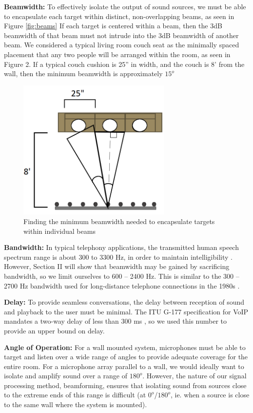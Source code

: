 \documentclass[10pt,journal,compsoc]{IEEEtran}
\begin{document}
\textbf{Beamwidth:} To effectively isolate the output of sound sources, we must be able to encapsulate each target within distinct, non-overlapping beams, as seen in Figure \ref{fig:beams} If each target is centered within a beam, then the 3dB beamwidth of that beam must not intrude into the 3dB beamwidth of another beam. We considered a typical living room couch seat as the minimally spaced placement that any two people will be arranged within the room, as seen in Figure 2. If a typical couch cushion is 25” in width, and the couch is 8’ from the wall, then the  minimum beamwidth is approximately $15^o$

\begin{figure}[!h]
    \centering
    \includegraphics[width=3in]{find_bw}
    \caption{Finding the minimum beamwidth needed to encapsulate targets within individual beams}
    \label{fig:find_bw}
\end{figure}

\textbf{Bandwidth:} In typical telephony applications, the transmitted human speech spectrum range is about 300 to 3300 Hz, in order to maintain intelligibility  \cite{polycom}. However, Section II will show that beamwidth may be gained by sacrificing bandwidth, so we limit ourselves to 600 – 2400 Hz. This is  similar to the 300 – 2700 Hz bandwidth used for long-distance telephone connections in the 1980s \cite{polycom}.

\textbf{Delay:} To provide seamless conversations, the delay between reception of sound and playback to the user must be minimal. The ITU G-177 specification for VoIP mandates a two-way delay of less than 300 ms \cite{itu}, so we used this number to provide an upper bound on delay.

\textbf{Angle of Operation:} For a wall mounted system, microphones must be able to target and listen over a wide range of angles to provide adequate coverage for the entire room. For a microphone array parallel to a wall, we would ideally want to isolate and amplify sound over a range of $180^o$. However, the nature of our signal processing method, beamforming, ensures that isolating sound from sources close to the extreme ends of this range is difficult (at $0^o$/$180^o$, ie. when a source is close to the same wall where the system is mounted).
\end{document}
